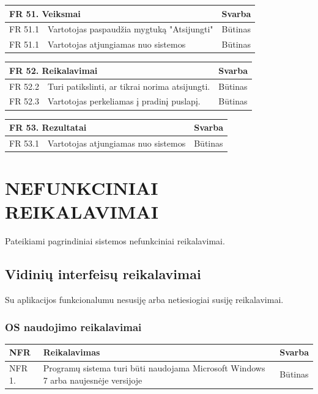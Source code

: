 \documentclass{VUMIFPSkursinis}
\begin{document}
 \noindent
 \vspace{5mm}
 \begin{tabular}{ | p{} | p{} | p{} |}
    \hline
        \multicolumn{2}{|l|}{   FR 51. Veiksmai} &Svarba  \\ \hline 
FR 51.1& Vartotojas paspaudžia mygtuką "Atsijungti"& Būtinas\\ \hline
 FR 51.1& Vartotojas atjungiamas nuo sistemos& Būtinas\\ \hline
    \end{tabular}
    \vspace{5mm}  
    \begin{tabular}{ | p{} | p{} | p{} |}
    \hline
     \multicolumn{2}{|l|}{   FR 52. Reikalavimai} &Svarba  \\ \hline 
FR 52.2  &  Turi patikslinti, ar tikrai norima atsijungti.&Būtinas\\ \hline
FR 52.3  &  Vartotojas perkeliamas į pradinį puslapį. &Būtinas\\ \hline
    \end{tabular}
    \vspace{5mm}
     \begin{tabular}{ | p{} | p{} | p{} |}
    \hline
     \multicolumn{2}{|l|}{ FR 53. Rezultatai } &Svarba  \\ \hline 
 FR 53.1& Vartotojas atjungiamas nuo sistemos& Būtinas\\ \hline

    \end{tabular}


\section{NEFUNKCINIAI REIKALAVIMAI}
Pateikiami pagrindiniai sistemos nefunkciniai reikalavimai.
\subsection{Vidinių interfeisų reikalavimai}
Su aplikacijos funkcionalumu nesusiję arba netiesiogiai susiję reikalavimai.
	\subsubsection{OS naudojimo reikalavimai}
    \noindent
    \begin{centering}
    	\begin{tabular}{ | p{} | p{} | p{} |}
    		\hline
   			NFR & Reikalavimas & Svarba       \\ \hline
		  	NFR 1. & Programų sistema turi būti naudojama Microsoft Windows 7 arba naujesnėje versijoje & Būtinas \\ \hline
   		\end{tabular}\\
    \end{centering}
    
\end{document}
